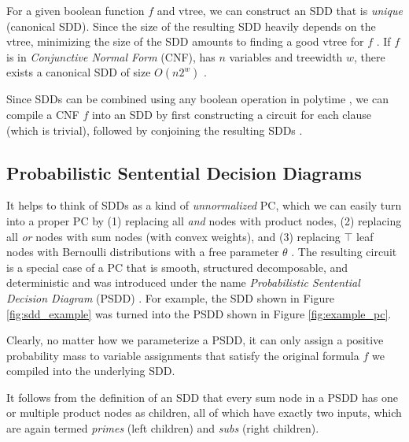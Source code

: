 For a given boolean function $f$ and vtree, we can construct an SDD that is \textit{unique} (canonical SDD). Since the size of the resulting SDD heavily depends on the vtree, minimizing the size of the SDD amounts to finding a good vtree for $f$ \cite{sdd, dynamic_min_choi}. If $f$ is in \textit{Conjunctive Normal Form} (CNF), has $n$ variables and treewidth $w$, there exists a canonical SDD of size $O(n 2^w)$ \cite{sdd}.


Since SDDs can be combined using any boolean operation in polytime \cite{sdd}, we can compile a CNF $f$ into an SDD by first constructing a circuit for each clause (which is trivial), followed by conjoining the resulting SDDs \cite{sdd}.

\subsection{Probabilistic Sentential Decision Diagrams}

It helps to think of SDDs as a kind of \textit{unnormalized} PC, which we can easily turn into a proper PC by (1) replacing all \textit{and} nodes with product nodes, (2) replacing all \textit{or} nodes with sum nodes (with convex weights), and (3) replacing $\top$ leaf nodes with Bernoulli distributions with a free parameter $\theta$ \cite{psdd}.
The resulting circuit is a special case of a PC that is smooth, structured decomposable, and deterministic and was introduced under the name \textit{Probabilistic Sentential Decision Diagram} (PSDD) \cite{psdd}.
For example, the SDD shown in Figure \ref{fig:sdd_example} was turned into the PSDD shown in Figure \ref{fig:example_pc}.

Clearly, no matter how we parameterize a PSDD, it can only assign a positive probability mass to variable assignments that satisfy the original formula $f$ we compiled into the underlying SDD.

It follows from the definition of an SDD that every sum node in a PSDD has one or multiple product nodes as children, all of which have exactly two inputs, which are again termed \textit{primes} (left children) and \textit{subs} (right children).


